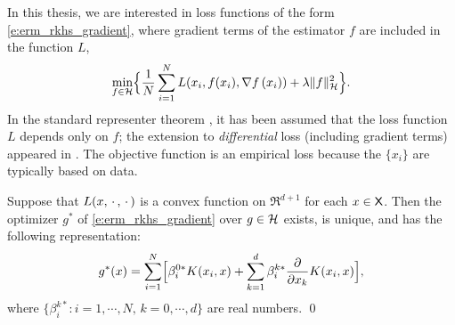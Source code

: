 In this thesis, we are interested in loss functions of the form \eqref{e:erm_rkhs_gradient}, where gradient terms of the estimator $f$ are included in the function $L$,
\begin{equation}
\min_{f\in\clH} \Bigl\{  \frac{1}{N} \sum_{i=1}^N L(x_i,  f(x_i), \nabla f\, (x_i))     + \lambda \| f\|^2_{\clH}  \Bigr\}.
\label{e:erm_rkhs_gradient}
\end{equation}
In the standard representer theorem , it has been assumed that the loss function $L$ depends only on $f$;  the extension to \textit{differential} loss (including gradient terms) appeared in \cite{zho08}.    The objective function is an empirical loss  because the $\{x_i\}$ are typically based on data.
\begin{theorem}
	\label{theorem:ext_rep_theorem}
	Suppose that $L(x,\,\cdot\,,\,\cdot\,)$ is a convex function on $\Re^{d+1}$ for each $x\in{\sf X}$.
	Then the  optimizer $g^*$ of \eqref{e:erm_rkhs_gradient} over $g\in{\cal H}$ exists, is unique, and has the following representation:
	\[
	g^*(x) = \sum_{i=1}^N  \Bigl[
	\beta_i^{0*}  K(x_i,x)   +  \sum_{k =1}^d  \beta_i^{k*} \frac{\partial}{\partial x_k}  K(x_i, x) \Bigr],
	\]
	where $\{\beta_i^{k*} \colon i=1,\cdots,N,\, k = 0,\cdots,d\}$ are real numbers.
	\qed
\end{theorem}
